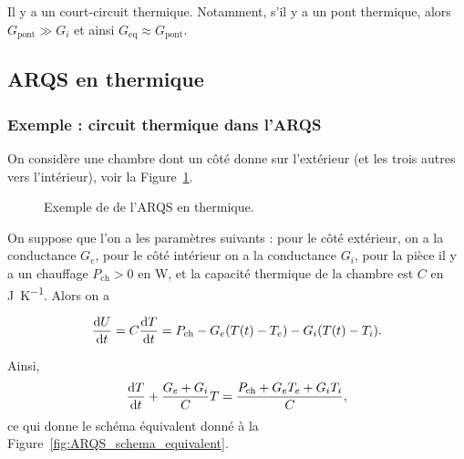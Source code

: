        Il y a un \og court-circuit thermique\fg. Notamment, s'il y a un pont thermique, alors $G_{\text{pont}}\gg G_i$ et ainsi $G_{\text{eq}}\approx G_{\text{pont}}$.

    \subsection{ARQS en thermique}

        \subsubsection{Exemple : circuit thermique dans l'ARQS}

            On considère une chambre dont un côté donne sur l'extérieur (et les trois autres vers l'intérieur), voir la Figure~\ref{fig:ARSQ_thermique_exemple}.
            \begin{figure}
                \centering
                \caption{Exemple de de l'ARQS en thermique.}    
                \label{fig:ARSQ_thermique_exemple}
            \end{figure}

            On suppose que l'on a les paramètres suivants : pour le côté extérieur, on a la conductance $G_e$, pour le côté intérieur on a la conductance $G_i$, pour la pièce il y a un chauffage $P_{\text{ch}}>0$ en \si{\watt}, et la capacité thermique de la chambre est $C$ en \si{\joule\per\kelvin}. Alors on a

            \begin{equation}
                \frac{\mathrm{d} U}{\mathrm{d} t}=C\frac{\mathrm{d} T}{\mathrm{d} t}=P_{\text{ch}}-G_e(T(t)-T_e)-G_i(T(t)-T_i).
            \end{equation}

            Ainsi,
            \begin{equation}
                \frac{\mathrm{d} T}{\mathrm{d} t}+\frac{G_e+G_i}{C}T=\frac{P_{\text{ch}}+G_e T_e+G_i T_i}{C},
            \end{equation}
            ce qui donne le schéma équivalent donné à la Figure~\ref{fig:ARQS_schema_equivalent}.

